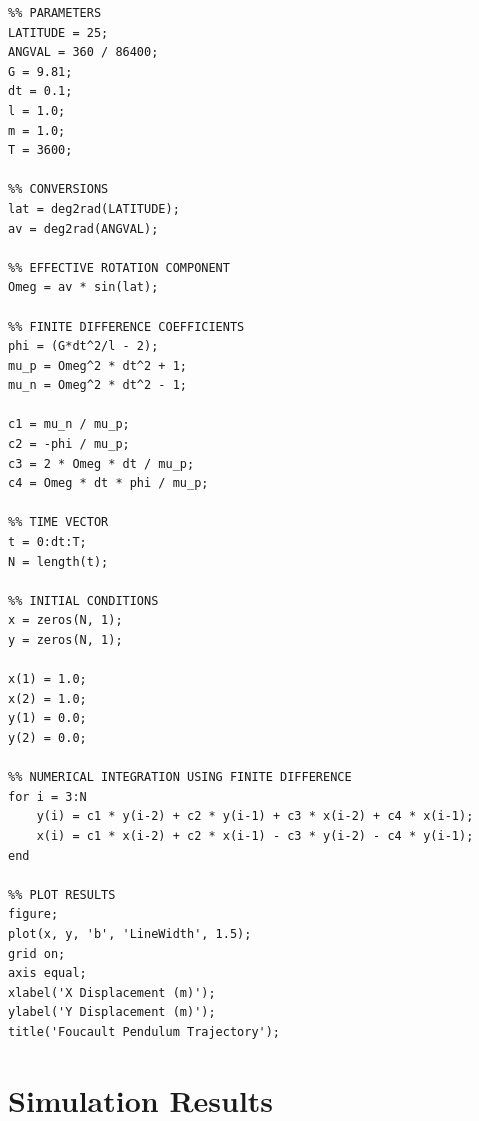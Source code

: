 \documentclass[12pt,a4paper]{article}
\begin{document}
\begin{lstlisting}
%% PARAMETERS
LATITUDE = 25;
ANGVAL = 360 / 86400;
G = 9.81;
dt = 0.1;
l = 1.0;
m = 1.0;
T = 3600;

%% CONVERSIONS
lat = deg2rad(LATITUDE);
av = deg2rad(ANGVAL);

%% EFFECTIVE ROTATION COMPONENT
Omeg = av * sin(lat);

%% FINITE DIFFERENCE COEFFICIENTS
phi = (G*dt^2/l - 2);
mu_p = Omeg^2 * dt^2 + 1;
mu_n = Omeg^2 * dt^2 - 1;

c1 = mu_n / mu_p;
c2 = -phi / mu_p;
c3 = 2 * Omeg * dt / mu_p;
c4 = Omeg * dt * phi / mu_p;

%% TIME VECTOR
t = 0:dt:T;
N = length(t);

%% INITIAL CONDITIONS
x = zeros(N, 1);
y = zeros(N, 1);

x(1) = 1.0;
x(2) = 1.0;
y(1) = 0.0;
y(2) = 0.0;

%% NUMERICAL INTEGRATION USING FINITE DIFFERENCE
for i = 3:N
    y(i) = c1 * y(i-2) + c2 * y(i-1) + c3 * x(i-2) + c4 * x(i-1);
    x(i) = c1 * x(i-2) + c2 * x(i-1) - c3 * y(i-2) - c4 * y(i-1);
end

%% PLOT RESULTS
figure;
plot(x, y, 'b', 'LineWidth', 1.5);
grid on;
axis equal;
xlabel('X Displacement (m)');
ylabel('Y Displacement (m)');
title('Foucault Pendulum Trajectory');
\end{lstlisting}


\section{Simulation Results}
\end{document}

